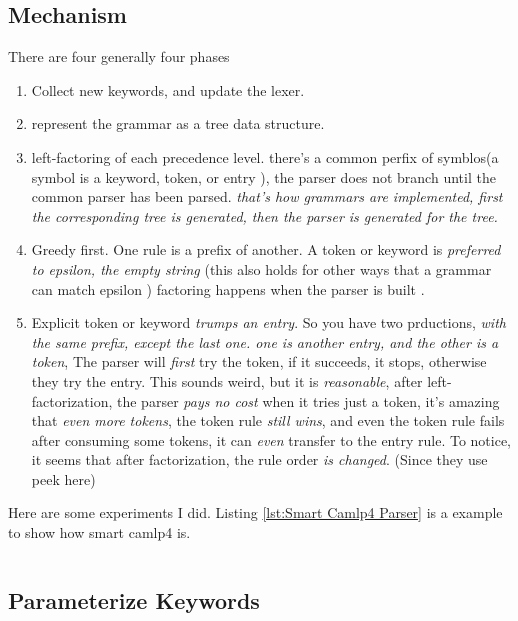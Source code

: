 \subsection{Mechanism}
  There are four generally four phases
  \begin{enumerate}
  \item Collect new keywords, and update the lexer.
  \item represent the grammar as a tree data structure.
  \item left-factoring of each precedence level. there's a common
    perfix of symblos(a symbol is a keyword, token, or entry ), the
    parser does not branch until the common parser has been
    parsed. \textit{that's how grammars are implemented, first the
      corresponding tree is generated, then the parser is generated
      for the tree.}
  \item Greedy first. One rule is a prefix of another.  A token or
    keyword is \textit{preferred to epsilon, the empty string} (this
    also holds for other ways that a grammar can match epsilon )
    factoring happens when the parser is built .
  \item Explicit token or keyword \textit{trumps an entry}. So you
    have two prductions, \textit{with the same prefix, except the last
      one. one is another entry, and the other is a token}, The parser
    will \textit{first} try the token, if it succeeds, it stops,
    otherwise they try the entry. This sounds weird, but it is
    \textit{reasonable}, after left-factorization, the parser
    \textit{pays no cost} when it tries just a token, it's amazing
    that \textit{even more tokens}, the token rule \textit{still
      wins}, and even the token rule fails after consuming some
    tokens, it can \textit{even} transfer to the entry rule.  To
    notice, it seems that after factorization, the rule order
    \textit{is changed}. (Since they use peek here)
  \end{enumerate}

  Here are some experiments I did. Listing \ref{lst:Smart Camlp4
    Parser} is a example to show how smart camlp4 is.

  \inputminted[fontsize=\scriptsize]{ocaml}{code/camlp4/airth/second.ml}

\subsection{Parameterize Keywords}
\label{Parameterize Keywords}

